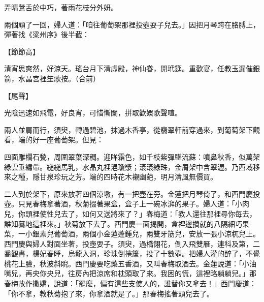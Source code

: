 弄晴鶯舌於中巧，著雨花枝分外妍。

兩個頑了一回，婦人道：「咱往葡萄架那裡投壺耍子兒去。」因把月琴跨在胳膊上，彈著找《梁州序》後半截：

【節節高】

清宵思爽然，好涼天。瑤台月下清虛殿，神仙眷，開玳筵。重歡宴，任教玉漏催銀箭，水晶宮裡笙歌按。（合前）

【尾聲】

光陰迅速如飛電，好良宵，可惜慚闌，拼取歡娛歌聲喧。

兩人並肩而行，須臾，轉過碧池，抹過木香亭，從翡翠軒前穿過來，到葡萄架下觀看，端的好一座葡萄架。但見：

四面雕欄石甃，周圍翠葉深稠。迎眸霜色，如千枝紫彈墜流蘇：噴鼻秋香，似萬架綠雲垂繡帶。縋縋馬乳，水晶丸裡浥瓊漿；滾滾綠珠，金屑架中含翠渥。乃西域移來之種，隱甘泉珍玩之芳。端的四時花木襯幽葩，明月清風無價買。

二人到於架下，原來放著四個涼墩，有一把壺在旁。金蓮把月琴倚了，和西門慶投壺。只見春梅拿著酒，秋菊掇著果盒，盒子上一碗冰湃的果子。婦人道：「小肉兒，你頭裡使性兒去了，如何又送將來了？」春梅道：「教人還往那裡尋你每去，誰知驀地這裡來。」秋菊放下去了。西門慶一面揭開，盒裡邊攢就的八隔細巧果菜，一小銀素兒葡萄酒，兩個小金蓮蓬鍾兒，兩雙牙筋兒，安放一張小涼杌兒上。西門慶與婦人對面坐著，投壺耍子。須臾，過橋翎花，倒入飛雙雁，連科及第，二喬觀書，楊妃春睡，烏龍入洞，珍珠倒捲簾，投了十數壺。把婦人灌的醉了，不覺桃花上臉，秋波斜睨。西門慶要吃藥五香酒，又叫春梅取酒去。金蓮說道：「小油嘴兒，再央你央兒，往房內把涼席和枕頭取了來。我困的慌，這裡略躺躺兒。」那春梅故作撒嬌，說道：「罷麼，偏有這些支使人的，誰替你又拿去！」西門慶道： 「你不拿，教秋菊抱了來，你拿酒就是了。」那春梅搖著頭兒去了。

